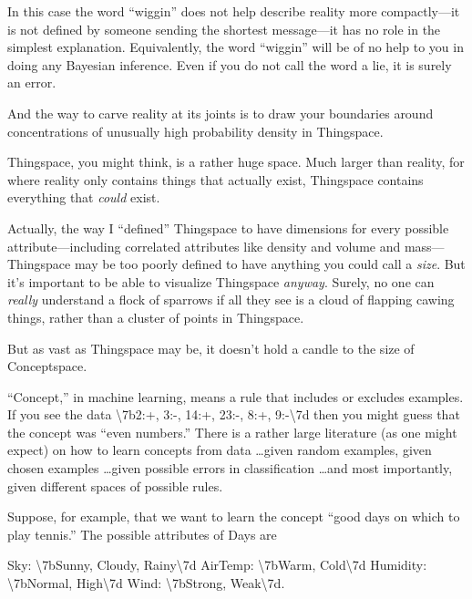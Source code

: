 {
 In this case the word
``wiggin'' does not help describe
reality more compactly---it is not defined by someone sending the
shortest message---it has no role in the simplest explanation.
Equivalently, the word ``wiggin''
will be of no help to you in doing any Bayesian inference. Even if you
do not call the word a lie, it is surely an error.}

{
 And the way to carve reality at its joints is to draw your
boundaries around concentrations of unusually high probability density
in Thingspace.}

\myendsectiontext


{
 Thingspace, you might think, is a rather huge space. Much larger
than reality, for where reality only contains things that actually
exist, Thingspace contains everything that \textit{could} exist. }

{
 Actually, the way I ``defined''
Thingspace to have dimensions for every possible attribute---including
correlated attributes like density and volume and mass---Thingspace may
be too poorly defined to have anything you could call a \textit{size}.
But it's important to be able to visualize Thingspace
\textit{anyway}. Surely, no one can \textit{really} understand a flock
of sparrows if all they see is a cloud of flapping cawing things,
rather than a cluster of points in Thingspace.}

{
 But as vast as Thingspace may be, it doesn't hold
a candle to the size of Conceptspace.}

{
 ``Concept,'' in machine
learning, means a rule that includes or excludes examples. If you see
the data {\textbackslash}{\textquotesingle}7b2:+, 3:-, 14:+, 23:-, 8:+,
9:-{\textbackslash}{\textquotesingle}7d then you might guess that the
concept was ``even numbers.'' There
is a rather large literature (as one might expect) on how to learn
concepts from data \ldots given random examples, given chosen examples
\ldots given possible errors in classification \ldots and most
importantly, given different spaces of possible rules.}

{
 Suppose, for example, that we want to learn the concept
``good days on which to play
tennis.'' The possible attributes of Days are}

{\centering
 Sky: {\textbackslash}{\textquotesingle}7bSunny, Cloudy,
Rainy{\textbackslash}{\textquotesingle}7d\newline
 AirTemp: {\textbackslash}{\textquotesingle}7bWarm,
Cold{\textbackslash}{\textquotesingle}7d\newline
 Humidity: {\textbackslash}{\textquotesingle}7bNormal,
High{\textbackslash}{\textquotesingle}7d\newline
 Wind: {\textbackslash}{\textquotesingle}7bStrong,
Weak{\textbackslash}{\textquotesingle}7d.
\par}


